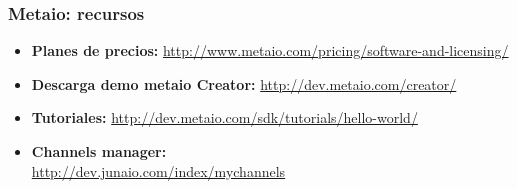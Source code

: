 \frame
{
\frametitle{Metaio: recursos}
\begin{itemize}
\item \textbf{Planes de precios:} \url{http://www.metaio.com/pricing/software-and-licensing/}
\item \textbf{Descarga demo metaio Creator:} \url{http://dev.metaio.com/creator/}
\item \textbf{Tutoriales:} \url{http://dev.metaio.com/sdk/tutorials/hello-world/}
\item \textbf{Channels manager:} \\\url{http://dev.junaio.com/index/mychannels}
\end{itemize}
}

